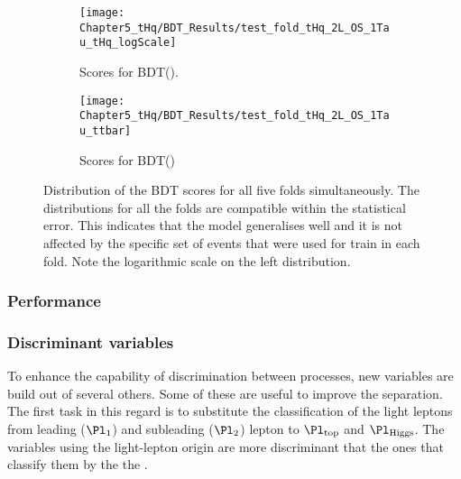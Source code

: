 \begin{figure}[htbp!]
  \centering  
  \begin{subfigure}[b]{0.475\textwidth}
    \centering
    \texttt{[image: Chapter5\_tHq/BDT\_Results/test\_fold\_tHq\_2L\_OS\_1Tau\_tHq\_logScale]}
    \caption{Scores for BDT(\tHq).}
     \label{fig:ChaptH:EventSelection:BDT:OS_ScoresCombo:tHq}
  \end{subfigure}
  \hfill
  \begin{subfigure}[b]{0.475\textwidth}
    \centering
    \texttt{[image: Chapter5\_tHq/BDT\_Results/test\_fold\_tHq\_2L\_OS\_1Tau\_ttbar]}
    \caption{Scores for BDT(\ttbar)}
     \label{fig:ChaptH:EventSelection:BDT:OS_ScoresCombo_ttbar}
  \end{subfigure}
  \caption{Distribution of the BDT scores for all five folds simultaneously. The distributions for
  all the folds are compatible within the statistical error. This indicates that the model generalises well
  and it is not affected by the specific set of events that were used for train in each fold. 
  Note the logarithmic scale on the left distribution.}
  \label{fig:ChaptH:EventSelection:BDT:OS_ScoresCombo}
\end{figure}







\subsubsection{Performance}
\subsubsection{Discriminant variables}
To enhance the capability of discrimination between processes, new variables are build out of several others.
Some of these are useful to improve the separation. 
The first task in this regard is to substitute the classification of the light leptons from leading 
($\Pl_{\text{1}}$) and subleading ($\Pl_{\text{2}}$) lepton to $\Pl_{\text{top}}$ and $\Pl_{\text{Higgs}}$. 
The variables using the light-lepton origin are more discriminant that the ones that classify them by the 
the \pt. 
